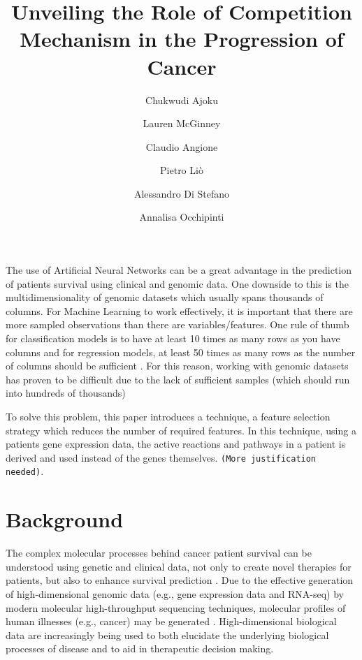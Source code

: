 \documentclass[10pt,twocolumn,twoside,lineno]{gsajnl}
\title{Unveiling the Role of Competition Mechanism in the Progression of Cancer}
\author[$\dagger$]{Chukwudi Ajoku}
\author[$\dagger$]{Lauren McGinney}
\author[$\dagger$]{Claudio Angione}
\author[$\ast$]{Pietro Li\`{o}}
\author[$\dagger$]{Alessandro Di Stefano}
\author[$\dagger$]{Annalisa Occhipinti}
\affil[$\dagger$]{Teesside University}
\affil[$\ast$]{University of Cambridge}
\begin{document}
\maketitle
\thispagestyle{firststyle}
\vspace{-13pt}%

\lettrine[lines=2]{\color{color2}T}{}he use of Artificial Neural Networks can be a great advantage in the prediction of patients survival using clinical and genomic data. One downside to this is the multidimensionality of genomic datasets which usually spans thousands of columns. For Machine Learning to work effectively, it is important that there are more sampled observations than there are variables/features. One rule of thumb for classification models is to have at least 10 times as many rows as you have columns and for regression models, at least 50 times as many rows as the number of columns should be sufficient \citep{googledoc}. For this reason, working with genomic datasets has proven to be difficult due to the lack of sufficient samples (which should run into hundreds of thousands) 


To solve this problem, this paper introduces a technique, a feature selection strategy which reduces the number of required features. In this technique, using a patients gene expression data, the active reactions and pathways in a patient is derived and used instead of the genes themselves. \verb|(More justification needed)|.


\section{Background}
The complex molecular processes behind cancer patient survival can be understood using genetic and clinical data, not only to create novel therapies for patients, but also to enhance survival prediction \citep{doi:10.4137/BIC.S33380}. Due to the effective generation of high-dimensional genomic data (e.g., gene expression data and RNA-seq) by modern molecular high-throughput sequencing techniques, molecular profiles of human illnesses (e.g., cancer) may be generated \citep{10.1093/bib/bby051}. High-dimensional biological data are increasingly being used to both elucidate the underlying biological processes of disease and to aid in therapeutic decision making.
\end{document}
